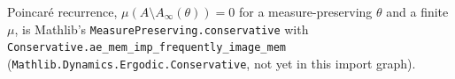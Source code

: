 \begin{remark}[Georgii (18.15)]
    \label{rmk:lo-18-15}

    Poincar\'e recurrence, $\mu(A \setminus A_\infty(\theta)) = 0$ for a measure-preserving
    $\theta$ and a finite $\mu$, is Mathlib's \texttt{MeasurePreserving.conservative} with
    \texttt{Conservative.ae\_mem\_imp\_frequently\_image\_mem}
    (\texttt{Mathlib.Dynamics.Ergodic.Conservative}, not yet in this import graph).
\end{remark}
